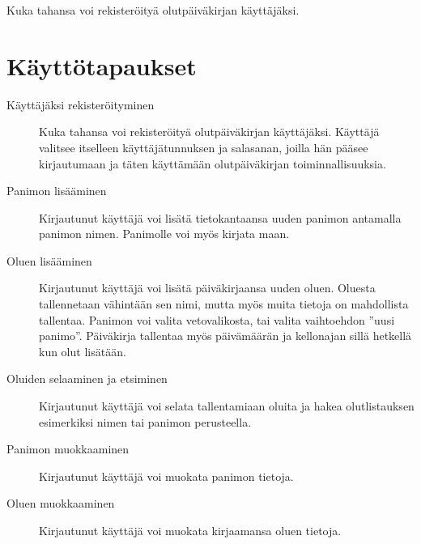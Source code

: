 \documentclass[12pt]{amsart}
\begin{document}
Kuka tahansa voi rekisteröityä olutpäiväkirjan käyttäjäksi.

\section{Käyttötapaukset}

\begin{description}
\item[Käyttäjäksi rekisteröityminen] Kuka tahansa voi rekisteröityä olutpäiväkirjan käyttäjäksi. Käyttäjä valitsee itselleen käyttäjätunnuksen ja salasanan, joilla hän pääsee kirjautumaan ja täten käyttämään olutpäiväkirjan toiminnallisuuksia.

\item[Panimon lisääminen] Kirjautunut käyttäjä voi lisätä tietokantaansa uuden panimon antamalla panimon nimen. Panimolle voi myös kirjata maan.

\item[Oluen lisääminen] Kirjautunut käyttäjä voi lisätä päiväkirjaansa uuden oluen. Oluesta tallennetaan vähintään sen nimi, mutta myös muita tietoja on mahdollista tallentaa. Panimon voi valita vetovalikosta, tai valita vaihtoehdon ''uusi panimo''. Päiväkirja tallentaa myös päivämäärän ja kellonajan sillä hetkellä kun olut lisätään.

\item[Oluiden selaaminen ja etsiminen] Kirjautunut käyttäjä voi selata tallentamiaan oluita ja hakea olutlistauksen esimerkiksi nimen tai panimon perusteella.

\item[Panimon muokkaaminen] Kirjautunut käyttäjä voi muokata panimon tietoja.

\item[Oluen muokkaaminen] Kirjautunut käyttäjä voi muokata kirjaamansa oluen tietoja.

\end{description}
\end{document}

